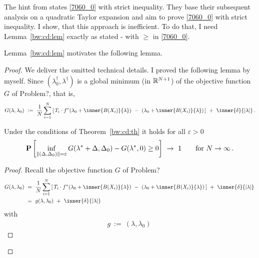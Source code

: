 \begin{remark}
  The hint from \cite[page 22]{Wang2019}
  states
  \eqref{7060_0}
  with strict inequality.
  They base their subsequent analysis on a quadratic Taylor expansion and aim to prove \eqref{7060_0} with strict inequality.
  I show, that this approach is inefficient.  
  To do that, I need Lemma~\ref{bw:cd:lem} exactly as stated - with $\ge$ in \eqref{7060_0}.
\end{remark}
Lemma~\ref{bw:cd:lem} motivates the following lemma.
\begin{proof}
We deliver the omitted technical details.
I proved the following lemma by myself.
Since 
$
(\lambda_0^\dagger,\lambda^\dagger)
$
is a global minimum (in $\mathbb{R}^{N+1}$) of the 
objective function $G$ of Problem?, that is,
\begin{gather*}
  G(\lambda,\lambda_0)
  \ 
  :=
  \ 
    \frac{1}{N}
\sum_{i=1} 
  ^N
  \left[ 
    \,
  T_i
  \cdot
  f^*
  \!
  \left( 
\lambda_0
+
\inner
{B(X_i)}
{\lambda}
  \right)
  \ 
-
\ 
  \left( 
\lambda_0
+
\inner
{B(X_i)}
{\lambda}
  \right)
  \,
  \right]
  \ 
+
\ 
\inner
{\delta}
{|\lambda|}
\,.
\end{gather*}
 \begin{lemma}
   Under the conditions of Theorem~\ref{bw:cd:th} it holds
   for all $\varepsilon>0$
\begin{gather}
   \P
   \left[ 
     \inf _ { 
       \norm{
         (
     \Delta
     ,
     \Delta_0
         )
 } 
= \varepsilon }
     G
     (
     \lambda^*
      +
      \Delta
      ,
     \Delta_0
     )
     -
     G
     (
     \lambda^*,
     0
     )
     \ge 
     0
   \right]
   \ 
   \to
   \ 
   1
   \qquad
   \text{for}
   \ 
   N\to\infty
   \,.
\end{gather}
 \end{lemma}
 \begin{proof}
  Recall the objective function $G$ of Problem? 
\begin{align*}
  G(\lambda,\lambda_0)
  &
  \ 
  =
  \ 
    \frac{1}{N}
\sum_{i=1} 
  ^N
  \left[ 
    \,
  T_i
  \cdot
  f^*
  \!
  \left( 
\lambda_0
+
\inner
{B(X_i)}
{\lambda}
  \right)
  \ 
-
\ 
  \left( 
\lambda_0
+
\inner
{B(X_i)}
{\lambda}
  \right)
  \,
  \right]
  \ 
+
\ 
\inner
{\delta}
{|\lambda|}
\,
\\
  &
\ 
=
\ 
g(\lambda,\lambda_0)
\ 
+
\ 
\inner
{\delta}
{|\lambda|}
\,
\end{align*}
with
  \begin{gather}
    g
    \ 
    := 
    \ 
    (\lambda,\lambda_0)
    \ 

\end{gather}
\end{proof}
\end{proof}
